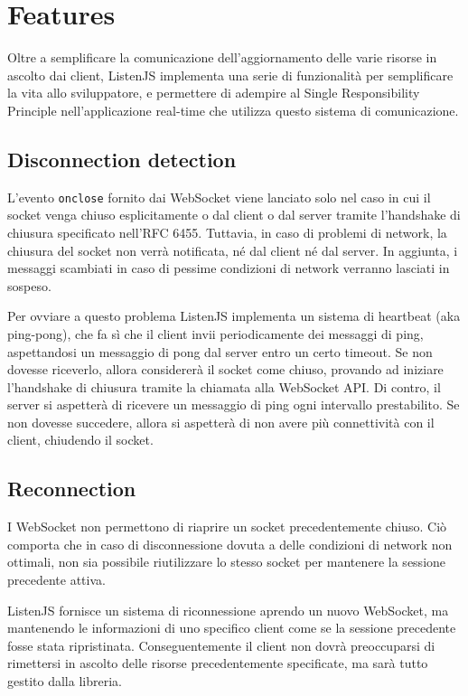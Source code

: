 \documentclass[12pt,a4paper,openright,twoside]{report}
\begin{document}
\section{Features}\label{sec_features}
Oltre a semplificare la comunicazione dell'aggiornamento delle varie risorse in ascolto dai client, ListenJS implementa una serie di funzionalità per semplificare la vita allo sviluppatore, e permettere di adempire al Single Responsibility Principle\cite{single_responsibility_principle} nell'applicazione real-time che utilizza questo sistema di comunicazione.
\subsection{Disconnection detection}
L'evento \lstinline{onclose} fornito dai WebSocket viene lanciato solo nel caso in cui il socket venga chiuso esplicitamente o dal client o dal server tramite l'handshake di chiusura specificato nell'RFC 6455. Tuttavia, in caso di problemi di network, la chiusura del socket non verrà notificata, né dal client né dal server. In aggiunta, i messaggi scambiati in caso di pessime condizioni di network verranno lasciati in sospeso.

\bigskip

Per ovviare a questo problema ListenJS implementa un sistema di heartbeat (aka ping-pong), che fa sì che il client invii periodicamente dei messaggi di ping, aspettandosi un messaggio di pong dal server entro un certo timeout. Se non dovesse riceverlo, allora considererà il socket come chiuso, provando ad iniziare l'handshake di chiusura tramite la chiamata alla WebSocket API. Di contro, il server si aspetterà di ricevere un messaggio di ping ogni intervallo prestabilito. Se non dovesse succedere, allora si aspetterà di non avere più connettività con il client, chiudendo il socket.
\subsection{Reconnection}
I WebSocket non permettono di riaprire un socket precedentemente chiuso. Ciò comporta che in caso di disconnessione dovuta a delle condizioni di network non ottimali, non sia possibile riutilizzare lo stesso socket per mantenere la sessione precedente attiva.

\bigskip

ListenJS fornisce un sistema di riconnessione aprendo un nuovo WebSocket, ma mantenendo le informazioni di uno specifico client come se la sessione precedente fosse stata ripristinata. Conseguentemente il client non dovrà preoccuparsi di rimettersi in ascolto delle risorse precedentemente specificate, ma sarà tutto gestito dalla libreria.
\end{document}
